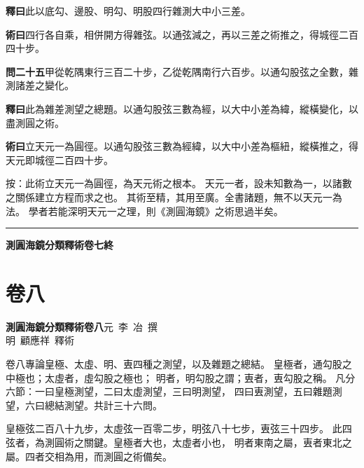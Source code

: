 \documentclass[12pt,a4paper]{article}
\newcommand{\Volume}[1]{\newpage\section*{卷#1}}
\begin{document}
\noindent\textbf{釋曰}\quad 此以底勾、邊股、明勾、明股四行雜測大中小三差。

\vspace{0.3em}

\noindent\textbf{術曰}\quad 四行各自乘，相併開方得雜弦。以通弦減之，再以三差之術推之，得城徑二百四十步。

\vspace{0.5em}

\noindent\textbf{問二十五}\quad 甲從乾隅東行三百二十步，乙從乾隅南行六百步。以通勾股弦之全數，雜測諸差之變化。

\vspace{0.3em}

\noindent\textbf{釋曰}\quad 此為雜差測望之總題。以通勾股弦三數為經，以大中小差為緯，縱橫變化，以盡測圓之術。

\vspace{0.3em}

\noindent\textbf{術曰}\quad 立天元一為圓徑。以通勾股弦三數為經緯，以大中小差為樞紐，縱橫推之，得天元即城徑二百四十步。

\vspace{0.3em}

\noindent
按：此術立天元一為圓徑，為天元術之根本。
天元一者，設未知數為一，以諸數之關係建立方程而求之也。
其術至精，其用至廣。全書諸題，無不以天元一為法。
學者若能深明天元一之理，則《測圓海鏡》之術思過半矣。

\vspace{1em}
\begin{center}
\rule{0.5\textwidth}{0.4pt}

\textbf{測圓海鏡分類釋術卷七終}
\end{center}


\Volume{八}

\noindent\textbf{測圓海鏡分類釋術卷八}\quad 元~李~冶~撰\\
明~顧應祥~釋術

\vspace{1em}

\noindent
卷八專論皇極、太虛、明、叀四種之測望，以及雜題之總結。
皇極者，通勾股之中極也；太虛者，虛勾股之極也；
明者，明勾股之謂；叀者，叀勾股之稱。
凡分六節：一曰皇極測望，二曰太虛測望，三曰明測望，
四曰叀測望，五曰雜題測望，六曰總結測望。共計三十六問。

\vspace{0.5em}

\noindent
皇極弦二百八十九步，太虛弦一百零二步，明弦八十七步，叀弦三十四步。
此四弦者，為測圓術之關鍵。皇極者大也，太虛者小也，
明者東南之屬，叀者東北之屬。四者交相為用，而測圓之術備矣。
\end{document}
